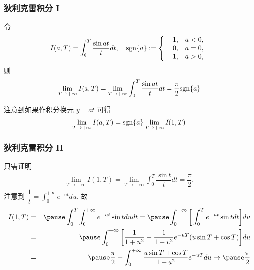 \documentclass[Prob-All.tex]{subfiles}
\begin{document}
\begin{frame}%
	\frametitle{狄利克雷积分 I}
	\begin{lem}[狄利克雷积分] 令
		\[I(a,T)=\int_0^T \dfrac{\sin at}{t}dt,\quad{\rm sgn}\{a\}:=\left\{
		\begin{array}{rl}
			-1,& a<0,\\
			0,& a=0,\\
			1,& a>0,
		\end{array}\right.\] 则
		\[\lim_{T\rightarrow+\infty}I(a,T)=\lim_{T\rightarrow+\infty}\int_0^T \dfrac{\sin at}{t}dt=\dfrac{\pi}{2}
		{\rm sgn}\{a\}\]
	\end{lem}

	\zheng 注意到如果作积分换元 $y=at$ 可得
	\begin{eqnarray*}
		\lim_{T\rightarrow+\infty}I(a,T)={\rm sgn}\{a\}\lim_{T\rightarrow+\infty}I(1,T)
	\end{eqnarray*}
\end{frame}
\begin{frame}%
	\frametitle{狄利克雷积分 II}
	只需证明
	\begin{eqnarray*}
		\lim_{T\rightarrow+\infty}I(1,T)=\lim_{T\rightarrow+\infty}\int_0^T\dfrac{\sin t}{t}dt=\dfrac{\pi}{2}.
	\end{eqnarray*}
	注意到 $\dfrac{1}{t}=\int_0^{+\infty} e^{-ut} du$, 故
	\begin{eqnarray*}
		I(1,T)&=&\pause \int_0^T\int_0^{+\infty}e^{-ut}\sin tdu dt=\pause \int_0^{+\infty} \bigg[\int_0^Te^{-ut}\sin tdt\bigg] du\\
		&=&\pause  \int_0^{+\infty}\bigg[\dfrac{1}{1+u^2}-\dfrac{1}{1+u^2}e^{-uT}(u\sin T+\cos T)\bigg]du \\
		&=&\pause \dfrac{\pi}{2}- \int_0^{+\infty}\dfrac{u\sin T+\cos T}{1+u^2}e^{-uT}du\rightarrow \pause \dfrac{\pi}{2}
	\end{eqnarray*}

\end{frame}
\end{document}
